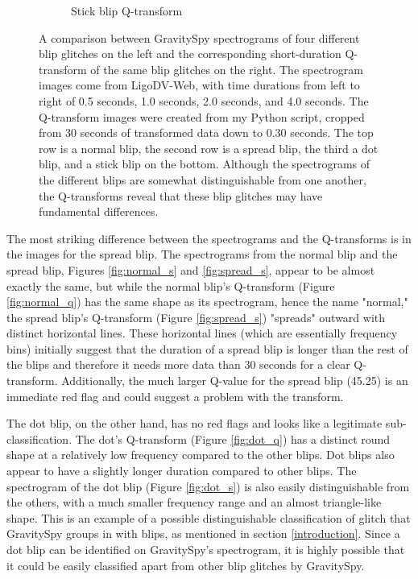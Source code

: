 \documentclass[a4paper]{article}
\begin{document}
\begin{figure}[h!]
\begin{subfigure}[t]{.29\textwidth}
		\caption{Stick blip Q-transform}
		\label{fig:stick_q}
	\end{subfigure}
	\caption{A comparison between GravitySpy spectrograms of four different blip glitches on the left and the corresponding short-duration Q-transform of the same blip glitches on the right. The spectrogram images come from LigoDV-Web, with time durations from left to right of 0.5 seconds, 1.0 seconds, 2.0 seconds, and 4.0 seconds. The Q-transform images were created from my Python script, cropped from 30 seconds of transformed data down to 0.30 seconds. The top row is a normal blip, the second row is a spread blip, the third a dot blip, and a stick blip on the bottom. Although the spectrograms of the different blips are somewhat distinguishable from one another, the Q-transforms reveal that these blip glitches may have fundamental differences.}
	\label{fig:comparison}
\end{figure}

The most striking difference between the spectrograms and the Q-transforms is in the images for the spread blip. The spectrograms from the normal blip and the spread blip, Figures \ref{fig:normal_s} and \ref{fig:spread_s}, appear to be almost exactly the same, but while the normal blip's Q-transform (Figure \ref{fig:normal_q}) has the same shape as its spectrogram, hence the name "normal," the spread blip's Q-transform (Figure \ref{fig:spread_s}) "spreads" outward with distinct horizontal lines. These horizontal lines (which are essentially frequency bins) initially suggest that the duration of a spread blip is longer than the rest of the blips and therefore it needs more data than 30 seconds for a clear Q-transform. Additionally, the much larger Q-value for the spread blip (45.25) is an immediate red flag and could suggest a problem with the transform.

The dot blip, on the other hand, has no red flags and looks like a legitimate sub-classification. The dot's Q-transform (Figure \ref{fig:dot_q}) has a distinct round shape at a relatively low frequency compared to the other blips. Dot blips also appear to have a slightly longer duration compared to other blips. The spectrogram of the dot blip (Figure \ref{fig:dot_s}) is also easily distinguishable from the others, with a much smaller frequency range and an almost triangle-like shape. This is an example of a possible distinguishable classification of glitch that GravitySpy groups in with blips, as mentioned in section \ref{introduction}. Since a dot blip can be identified on GravitySpy's spectrogram, it is highly possible that it could be easily classified apart from other blip glitches by GravitySpy. 
\end{document}
